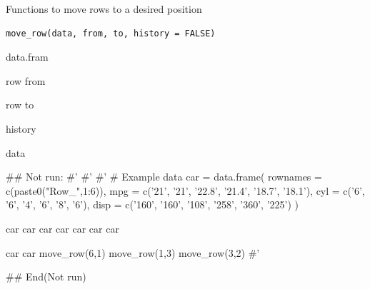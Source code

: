 \documentclass[a4paper]{book}
\begin{document}
%
\begin{Description}
Functions to move rows to a desired position
\end{Description}
%
\begin{Usage}
\begin{verbatim}
move_row(data, from, to, history = FALSE)
\end{verbatim}
\end{Usage}
%
\begin{Arguments}
\begin{ldescription}
\item[\code{data}] data.fram

\item[\code{from}] row from

\item[\code{to}] row to

\item[\code{history}] history
\end{ldescription}
\end{Arguments}
%
\begin{Value}
data
\end{Value}
%
\begin{Examples}
\begin{ExampleCode}

\#\# Not run: 
#' #'
#' # Example data
car = data.frame(
  rownames = c(paste0("Row_",1:6)),
  mpg = c('21', '21', '22.8', '21.4', '18.7', '18.1'),
  cyl = c('6', '6', '4', '6', '8', '6'),
  disp = c('160', '160', '108', '258', '360', '225')
)

car
car%
car%
car%
car%
car%
car%

car
car%
  move_row(6,1)%
  move_row(1,3)%
  move_row(3,2)
#'

## End(Not run)


\end{ExampleCode}
\end{Examples}
\end{document}
